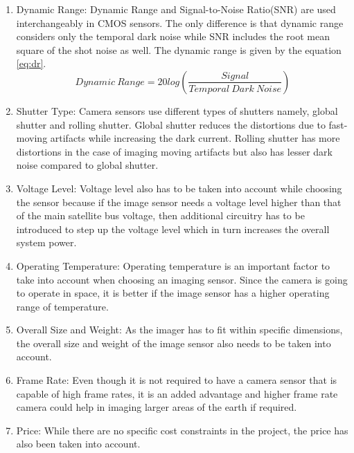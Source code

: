 \begin{enumerate}
\item Dynamic Range: Dynamic Range and Signal-to-Noise Ratio(SNR) are used interchangeably in CMOS sensors. The only difference is that dynamic range considers only the temporal dark noise while SNR includes the root mean square of the shot noise as well.  The dynamic range is given by the equation \ref{eq:dr}.
\begin{equation}
\label{eq:dr}
Dynamic \ Range = 20log(\frac{Signal}{Temporal \ Dark \ Noise})
\end{equation}

\item Shutter Type: Camera sensors use different types of shutters namely, global shutter and rolling shutter. Global shutter reduces the distortions due to fast-moving artifacts while increasing the dark current. Rolling shutter has more distortions in the case of imaging moving artifacts but also has lesser dark noise compared to global shutter. 

\item Voltage Level: Voltage level also has to be taken into account while choosing the sensor because if the image sensor needs a voltage level higher than that of the main satellite bus voltage, then additional circuitry has to be introduced to step up the voltage level which in turn increases the overall system power.  

\item Operating Temperature: Operating temperature is an important factor to take into account when choosing an imaging sensor. Since the camera is going to operate in space, it is better if the image sensor has a higher operating range of temperature. 

\item Overall Size and Weight: As the imager has to fit within specific dimensions, the overall size and weight of the image sensor also needs to be taken into account.

\item Frame Rate: Even though it is not required to have a camera sensor that is capable of high frame rates, it is an added advantage and higher frame rate camera could help in imaging larger areas of the earth if required. 
\item Price: While there are no specific cost constraints in the project, the price has also been taken into account.
\end{enumerate}

